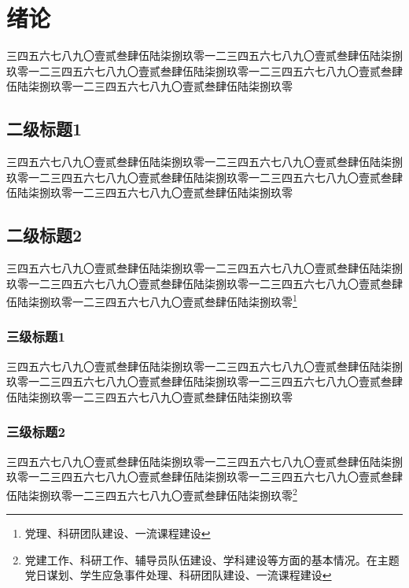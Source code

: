 \documentclass[master,academic]{ysuthesis} %
\begin{document}

	\customizedtableofcontents

	\chapter{绪论}

		三四五六七八九〇壹贰叁肆伍陆柒捌玖零一二三四五六七八九〇壹贰叁肆伍陆柒捌玖零一二三四五六七八九〇壹贰叁肆伍陆柒捌玖零一二三四五六七八九〇壹贰叁肆伍陆柒捌玖零一二三四五六七八九〇壹贰叁肆伍陆柒捌玖零

	\section{二级标题1}

		三四五六七八九〇壹贰叁肆伍陆柒捌玖零一二三四五六七八九〇壹贰叁肆伍陆柒捌玖零一二三四五六七八九〇壹贰叁肆伍陆柒捌玖零一二三四五六七八九〇壹贰叁肆伍陆柒捌玖零一二三四五六七八九〇壹贰叁肆伍陆柒捌玖零

	\section{二级标题2}

		三四五六七八九〇壹贰叁肆伍陆柒捌玖零一二三四五六七八九〇壹贰叁肆伍陆柒捌玖零一二三四五六七八九〇壹贰叁肆伍陆柒捌玖零一二三四五六七八九〇壹贰叁肆伍陆柒捌玖零一二三四五六七八九〇壹贰叁肆伍陆柒捌玖零\footnote{党理、科研团队建设、一流课程建设}


	\subsection{三级标题1}

		三四五六七八九〇壹贰叁肆伍陆柒捌玖零一二三四五六七八九〇壹贰叁肆伍陆柒捌玖零一二三四五六七八九〇壹贰叁肆伍陆柒捌玖零一二三四五六七八九〇壹贰叁肆伍陆柒捌玖零一二三四五六七八九〇壹贰叁肆伍陆柒捌玖零

	\subsection{三级标题2}

		三四五六七八九〇壹贰叁肆伍陆柒捌玖零一二三四五六七八九〇壹贰叁肆伍陆柒捌玖零一二三四五六七八九〇壹贰叁肆伍陆柒捌玖零一二三四五六七八九〇壹贰叁肆伍陆柒捌玖零一二三四五六七八九〇壹贰叁肆伍陆柒捌玖零\footnote{党建工作、科研工作、辅导员队伍建设、学科建设等方面的基本情况。在主题党日谋划、学生应急事件处理、科研团队建设、一流课程建设}
\end{document}
